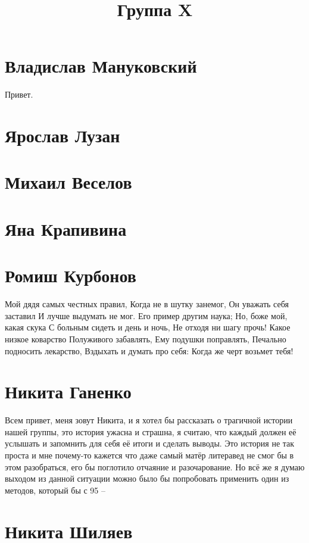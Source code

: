\documentclass{article}
\title{Группа X}
\begin{document}
\section*{Владислав Мануковский}
Привет.
\section*{Ярослав Лузан}

\section*{Михаил Веселов}

\section*{Яна Крапивина}

\section*{Ромиш Курбонов}

Мой дядя самых честных правил, Когда не в шутку занемог, Он уважать себя заставил И лучше выдумать не мог.
Его пример другим наука; Но, боже мой, какая скука С больным сидеть и день и ночь, Не отходя ни шагу прочь!
Какое низкое коварство Полуживого забавлять, Ему подушки поправлять, Печально подносить лекарство,
Вздыхать и думать про себя: Когда же черт возьмет тебя!

\section*{Никита Ганенко}

Всем привет, меня зовут Никита, и я хотел бы рассказать о трагичной истории нашей группы, это история ужасна и страшна, я считаю, что каждый должен её услышать и запомнить для себя её итоги и сделать выводы. Это история не так проста и мне почему-то кажется что даже самый матёр литеравед не смог бы в этом разобраться, его бы поглотило отчаяние и разочарование. Но всё же я думаю выходом из данной ситуации можно было бы попробовать применить один из методов, который бы с 95%
--
\section*{Никита Шиляев}
\end{document}
